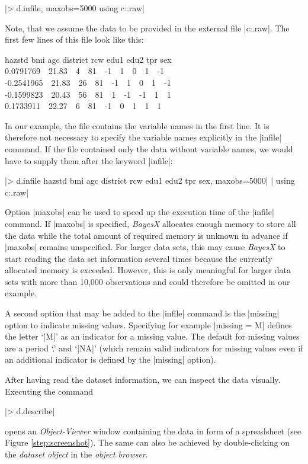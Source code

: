 |> d.infile, maxobs=5000 using c:\data\zambia.raw|

Note, that we assume the data to be provided in the external file |c:\data\zambia.raw|. The first few lines of this file look
like this:

{\footnotesize
 hazstd bmi agc district rcw edu1 edu2 tpr sex\\
 0.0791769 \,\, 21.83 \,\, 4 \,\, 81 \,\, -1 \,\, 1 \,\, 0 \,\, 1 \,\, -1\\
 -0.2541965 \,\, 21.83 \,\, 26 \,\, 81 \,\, -1 \,\, 1 \,\, 0 \,\, 1 \,\, -1\\
 -0.1599823 \,\, 20.43 \,\, 56 \,\, 81 \,\, 1 \,\, -1 \,\, -1 \,\, 1 \,\, 1\\
 0.1733911 \,\, 22.27 \,\, 6 \,\, 81 \,\, -1 \,\, 0 \,\, 1 \,\, 1 \,\, 1}

In our example, the file contains the variable names in the first line. It is therefore not necessary to specify the variable names explicitly in the
|infile| command. If the file contained only the data without variable names, we would have to supply them after the keyword
|infile|:

 |> d.infile hazstd bmi agc district rcw edu1 edu2 tpr sex, maxobs=5000|
 |  using c:\data\zambia.raw|

Option |maxobs| can be used to speed up the execution time of the |infile| command. If |maxobs| is specified, {\it BayesX}
allocates enough memory to store all the data while the total amount of required memory is unknown in advance if |maxobs|
remains unspecified. For larger data sets, this may cause {\it BayesX} to start reading the data set information several times
because the currently allocated memory is exceeded. However, this is only meaningful for larger data sets with more than 10,000
observations and could therefore be omitted in our example.

A second option that may be added to the |infile| command is the |missing| option to indicate missing values. Specifying for
example |missing = M| defines the letter `|M|' as an indicator for a missing value. The default for missing values are a period
`.' and `|NA|' (which remain valid indicators for missing values even if an additional indicator is defined by the |missing|
option).

After having read the dataset information, we can inspect the data visually. Executing the command

|> d.describe|

opens an {\it Object-Viewer} window containing the data in form of a spreadsheet (see Figure \ref{step:screenshot}). The same
can also be achieved by double-clicking on the {\it dataset object} in the {\it object browser}.

